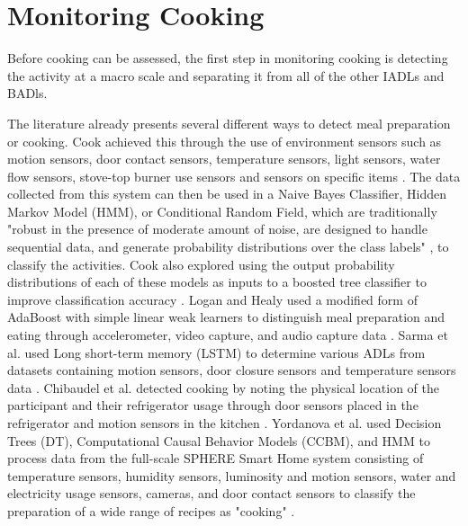 \section{Monitoring Cooking}\label{sec:monitoring-cooking}
Before cooking can be assessed, the first step in monitoring cooking is detecting the activity at a macro scale and separating it from all of the other IADLs and BADls. 

The literature already presents several different ways to detect meal preparation or cooking. Cook achieved this through the use of environment sensors such as motion sensors, door contact sensors, temperature sensors, light sensors, water flow sensors, stove-top burner use sensors and sensors on specific items \cite{cook_learning_2010}. The data collected from this system can then be used in a Naive Bayes Classifier, Hidden Markov Model (HMM), or Conditional Random Field, which are traditionally "robust in the presence of moderate amount of noise, are designed to handle sequential data, and generate probability distributions over the class labels" \cite{cook_learning_2010}, to classify the activities. Cook also explored using the output probability distributions of each of these models as inputs to a boosted tree classifier to improve classification accuracy \cite{cook_learning_2010}. Logan and Healy used a modified form of AdaBoost with simple linear weak learners to distinguish meal preparation and eating through accelerometer, video capture, and audio capture data \cite{logan_sensors_2006}. Sarma et al. used Long short-term memory (LSTM) to determine various ADLs from datasets containing motion sensors, door closure sensors and temperature sensors data \cite{sarma_activity_2019}. Chibaudel et al. detected cooking by noting the physical location of the participant and their refrigerator usage through door sensors placed in the refrigerator and motion sensors in the kitchen \cite{mokhtari_smart_2018}. Yordanova et al. used Decision Trees (DT), Computational Causal Behavior Models (CCBM), and HMM to process data from the full-scale SPHERE Smart Home system consisting of temperature sensors, humidity sensors, luminosity and motion sensors, water and electricity usage sensors, cameras, and door contact sensors to classify the preparation of a wide range of recipes as "cooking" \cite{yordanova_analysing_2019}.

